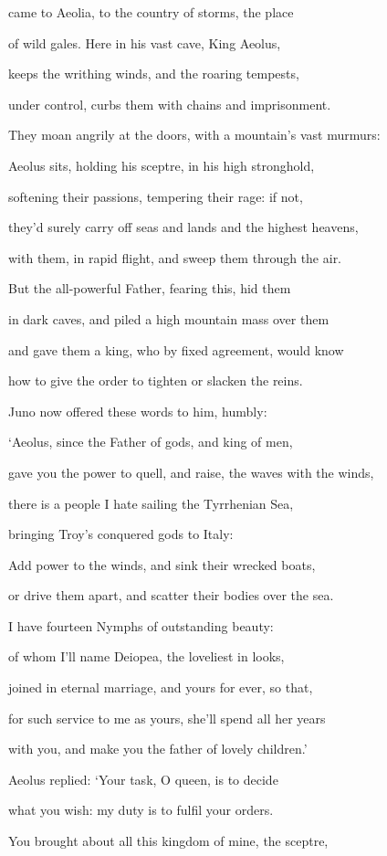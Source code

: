 \documentclass[12pt, a5paper, titlepage]{letter}
\begin{document}
came to Aeolia, to the country of storms, the place

of wild gales. Here in his vast cave, King Aeolus,

keeps the writhing winds, and the roaring tempests,

under control, curbs them with chains and imprisonment.

They moan angrily at the doors, with a mountain’s vast murmurs:

Aeolus sits, holding his sceptre, in his high stronghold,

softening their passions, tempering their rage: if not,

they’d surely carry off seas and lands and the highest heavens,

with them, in rapid flight, and sweep them through the air.

But the all-powerful Father, fearing this, hid them

in dark caves, and piled a high mountain mass over them

and gave them a king, who by fixed agreement, would know

how to give the order to tighten or slacken the reins.

Juno now offered these words to him, humbly:

‘Aeolus, since the Father of gods, and king of men,

gave you the power to quell, and raise, the waves with the winds,

there is a people I hate sailing the Tyrrhenian Sea,

bringing Troy’s conquered gods to Italy:

Add power to the winds, and sink their wrecked boats,

or drive them apart, and scatter their bodies over the sea.

I have fourteen Nymphs of outstanding beauty:

of whom I’ll name Deiopea, the loveliest in looks,

joined in eternal marriage, and yours for ever, so that,

for such service to me as yours, she’ll spend all her years

with you, and make you the father of lovely children.’

Aeolus replied: ‘Your task, O queen, is to decide

what you wish: my duty is to fulfil your orders.

You brought about all this kingdom of mine, the sceptre,
\end{document}
